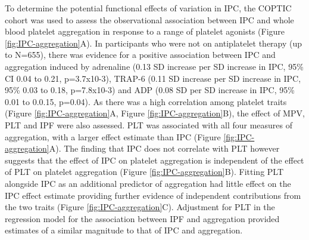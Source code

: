 \documentclass[11pt,twoside]{bristolthesis}
\begin{document}
To determine the potential functional effects of variation in IPC, the COPTIC cohort was used to assess the observational association between IPC and whole blood platelet aggregation in response to a range of platelet agonists (Figure \ref{fig:IPC-aggregation}A). In participants who were not on antiplatelet therapy (up to N=655), there was evidence for a positive association between IPC and aggregation induced by adrenaline (0.13 SD increase per SD increase in IPC, 95\% CI 0.04 to 0.21, p=3.7x10-3), TRAP-6 (0.11 SD increase per SD increase in IPC, 95\% 0.03 to 0.18, p=7.8x10-3) and ADP (0.08 SD per SD increase in IPC, 95\% 0.01 to 0.0.15, p=0.04). As there was a high correlation among platelet traits (Figure \ref{fig:IPC-aggregation}A, Figure \ref{fig:IPC-aggregation}B), the effect of MPV, PLT and IPF were also assessed. PLT was associated with all four measures of aggregation, with a larger effect estimate than IPC (Figure \ref{fig:IPC-aggregation}A). The finding that IPC does not correlate with PLT however suggests that the effect of IPC on platelet aggregation is independent of the effect of PLT on platelet aggregation (Figure \ref{fig:IPC-aggregation}B). Fitting PLT alongside IPC as an additional predictor of aggregation had little effect on the IPC effect estimate providing further evidence of independent contributions from the two traits (Figure \ref{fig:IPC-aggregation}C). Adjustment for PLT in the regression model for the association between IPF and aggregation provided estimates of a similar magnitude to that of IPC and aggregation.
\end{document}
